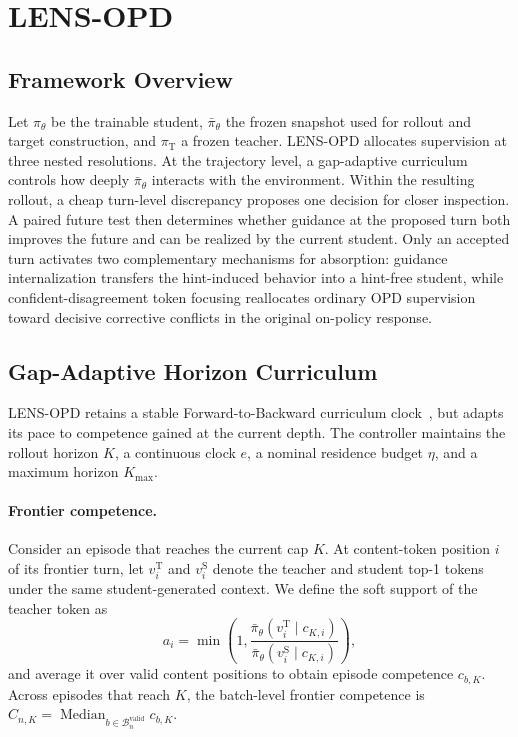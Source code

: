 \documentclass{article}
\begin{document}
\section{LENS-OPD}
\label{sec:method}

\subsection{Framework Overview}

Let $\pi_\theta$ be the trainable student, $\bar\pi_\theta$ the frozen snapshot used for
rollout and target construction, and $\pi_{\mathrm T}$ a frozen teacher.  LENS-OPD allocates
supervision at three nested resolutions.  At the trajectory level, a gap-adaptive curriculum controls
how deeply $\bar\pi_\theta$ interacts with the environment.  Within the resulting rollout, a cheap
turn-level discrepancy proposes one decision for closer inspection.  A paired future test then
determines whether guidance at the proposed turn both improves the future and can be realized by the
current student.  Only an accepted turn activates two complementary mechanisms for absorption:
guidance internalization transfers the hint-induced behavior into a hint-free student, while
confident-disagreement token focusing reallocates ordinary OPD supervision toward decisive
corrective conflicts in the original on-policy response.

\subsection{Gap-Adaptive Horizon Curriculum}

LENS-OPD retains a stable Forward-to-Backward curriculum clock~\citep{wang2026tcod}, but adapts its pace
to competence gained at the current depth.  The controller maintains the rollout horizon $K$, a
continuous clock $e$, a nominal residence budget $\eta$, and a maximum horizon $K_{\max}$.

\paragraph{Frontier competence.}
Consider an episode that reaches the current cap $K$.  At content-token position $i$ of its frontier
turn, let $v_i^{\mathrm T}$ and $v_i^{\mathrm S}$ denote the teacher and student top-1 tokens under
the same student-generated context.  We define the soft support of the teacher token as
\begin{equation}
    a_i
    =\min\!\left(
      1,
      \frac{\bar\pi_\theta(v_i^{\mathrm T}\mid c_{K,i})}
           {\bar\pi_\theta(v_i^{\mathrm S}\mid c_{K,i})}
      \right),
    \label{eq:frontier-soft-support}
\end{equation}
and average it over valid content positions to obtain episode competence $c_{b,K}$.  Across episodes
that reach $K$, the batch-level frontier competence is
$C_{n,K}=\operatorname{Median}_{b\in\mathcal B_n^{\mathrm{valid}}}c_{b,K}$.
\end{document}
